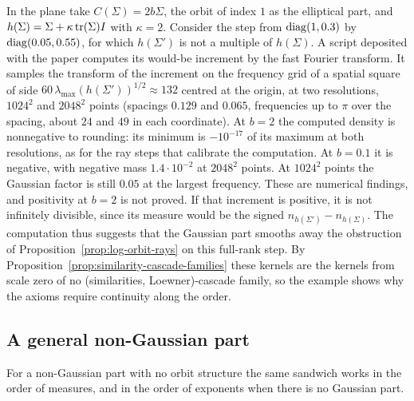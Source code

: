 \begin{remark}\label{rem:gaussian-matern-step}
In the plane take $C(\Sigma) = 2b\Sigma$, the \Matern{} orbit of index $1$ as the elliptical part, and
$h(\Sigma) = \Sigma + \kappa\operatorname{tr}(\Sigma)I$ with $\kappa = 2$. Consider the step from $\operatorname{diag}(1, 0.3)$ by
$\operatorname{diag}(0.05, 0.55)$, for which $h(\Sigma')$ is not a multiple of $h(\Sigma)$. A script deposited
with the paper computes its would-be increment by the fast Fourier transform. It samples the transform
of the increment on the frequency grid of a spatial square of side $60\,\lambda_{\max}(h(\Sigma'))^{1/2}
\approx 132$ centred at the origin, at two resolutions, $1024^2$ and $2048^2$ points (spacings $0.129$
and $0.065$, frequencies up to $\pi$ over the spacing, about $24$ and $49$ in each coordinate). At
$b = 2$ the computed density is nonnegative to rounding:
its minimum is $-10^{-17}$ of its maximum at both resolutions, as for the ray steps that calibrate the
computation. At $b = 0.1$ it is negative, with negative mass $1.4\cdot10^{-2}$ at $2048^2$ points.
At $1024^2$ points the Gaussian factor is still $0.05$ at the largest frequency. These are numerical
findings, and positivity at $b = 2$ is not proved. If that increment is positive, it is not infinitely
divisible, since its \Levy{} measure would be the signed $n_{h(\Sigma')} - n_{h(\Sigma)}$. The
computation thus suggests that the Gaussian part smooths away the obstruction of
Proposition~\ref{prop:log-orbit-rays} on this full-rank step. By
Proposition~\ref{prop:similarity-cascade-families} these kernels are the kernels from scale zero of no
(similarities, Loewner)-cascade family, so the example shows why the axioms require continuity along
the order.
\end{remark}

\subsection{A general non-Gaussian part}

For a non-Gaussian part with no orbit structure the same sandwich works in the order of \Levy{}
measures, and in the order of exponents when there is no Gaussian part.

